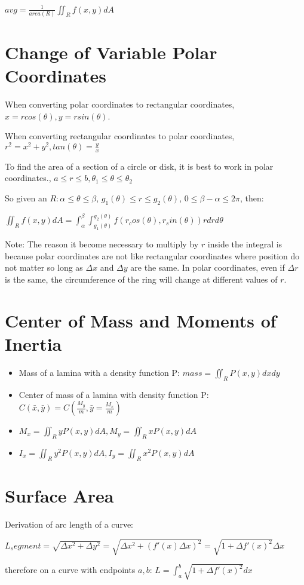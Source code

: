 \documentclass [12 pt, oneside] {book}
\begin{document}
$avg = \frac{1}{area(R)}\iint_R f(x,y)dA$

\section{Change of Variable Polar Coordinates}
When converting polar coordinates to rectangular coordinates, $x=rcos(\theta), y=rsin(\theta)$.

When converting rectangular coordinates to polar coordinates, $r^2=x^2+y^2, tan(\theta)=\frac{y}{x}$

To find the area of a section of a circle or disk, it is best to work in polar coordinates., $a\leq r\leq b, \theta_1\leq\theta\leq\theta_2$

So given an $R: \alpha\leq\theta\leq\beta$, $g_1(\theta)\leq r\leq g_2(\theta)$, $0\leq\beta - \alpha\leq 2\pi$, then:

$\iint_R f(x,y)dA = \int_\alpha^\beta\int_{g_1(\theta)}^{g_2(\theta)} f(r_cos(\theta),r_sin(\theta))rdrd\theta$

Note: The reason it become necessary to multiply by $r$ inside the integral is because polar coordinates are not like rectangular coordinates where position do not matter so long as $\Delta x$ and $\Delta y$ are the same. In polar coordinates, even if $\Delta r$ is the same, the circumference of the ring will change at different values of $r$.

\section{Center of Mass and Moments of Inertia}

\begin{itemize}
\item Mass of a lamina with a density function P: $mass = \iint_R P(x,y) dxdy$
\item Center of mass of a lamina with density function P: $C(\bar{x},\bar{y}) = C(\frac{M_y}{m}, \bar{y}=\frac{M_x}{m})$
\item $M_x=\iint_R yP(x,y)dA, M_y=\iint_R xP(x,y)dA$
\item $I_x=\iint_R y^2P(x,y)dA, I_y=\iint_R x^2P(x,y)dA$
\end{itemize}

\section{Surface Area}

Derivation of arc length of a curve:
\begin{center}
$L_segment=\sqrt{\Delta x^2 + \Delta y^2}=\sqrt{\Delta x^2 + (f'(x)\Delta x)^2}=\sqrt{1 + \Delta f'(x)^2}\Delta x$

therefore on a curve with endpoints $a,b$: $L=\int_a^b \sqrt{1 + \Delta f'(x)^2}dx$
\end{center}
\end{document}
